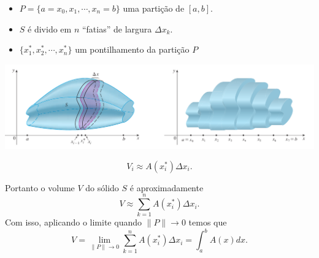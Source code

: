 \begin{frame}
\begin{itemize}
\item $P=\{a=x_0,x_1,\cdots,x_n=b\}$ uma partição de $[a,b]$.
\item $S$ é divido em $n$ ``fatias'' de largura $\Delta x_k$.
\item $\{x_1^\ast,x_2^\ast,\cdots,x_n^\ast\}$ um pontilhamento da partição $P$ 
\end{itemize}


\begin{center}
\includegraphics[scale=0.37]{volume-fatia-particao.png}
\end{center}

\[V_i\approx A(x_i^\ast)\Delta x_i.\]

\end{frame}

\begin{frame}

Portanto o volume $V$ do sólido $S$ é aproximadamente
\[V\approx\sum_{k=1}^n A(x_i^\ast)\Delta x_i.\]
Com isso, aplicando o limite quando $\|P\|\to 0$ temos que
\[V=\lim_{\|P\|\to 0}\sum_{k=1}^n A(x_i^\ast)\Delta x_i=\int_a^bA(x)dx.\] 

\end{frame}



